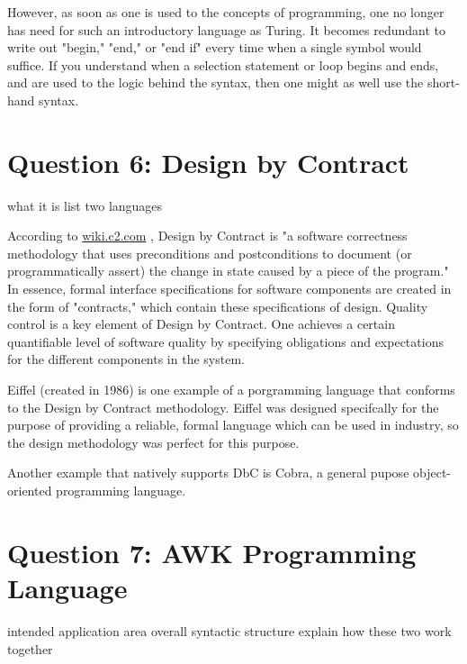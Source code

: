 \documentclass[a4paper]{article}
\begin{document}
	However, as soon as one is used to the concepts of programming, one no longer has need for such an introductory language as Turing. It becomes redundant to write out "begin," "end," or "end if" every time when a single symbol would suffice. If you understand when a selection statement or loop begins and ends, and are used to the logic behind the syntax, then one might as well use the short-hand syntax.
	
	
\section{Question 6: Design by Contract}
	what it is
	list two languages
	
	According to \url{wiki.c2.com} \cite{c2}, Design by Contract is "a software correctness methodology that uses preconditions and postconditions to document (or programmatically assert) the change in state caused by a piece of the program." In essence, formal interface specifications for software components are created in the form of "contracts," which contain these specifications of design. Quality control is a key element of Design by Contract. One achieves a certain quantifiable level of software quality by specifying obligations and expectations for the different components in the system.
	
	Eiffel (created in 1986) is one example of a porgramming language that conforms to the Design by Contract methodology. Eiffel was designed specifcally for the purpose of providing a reliable, formal language which can be used in industry, so the design methodology was perfect for this purpose. 
	
	Another example that natively supports DbC is Cobra, a general pupose object-oriented programming language.
	
\section{Question 7: AWK Programming Language}
	intended application area
	overall syntactic structure
	explain how these two work together

{}

	
\end{document}
